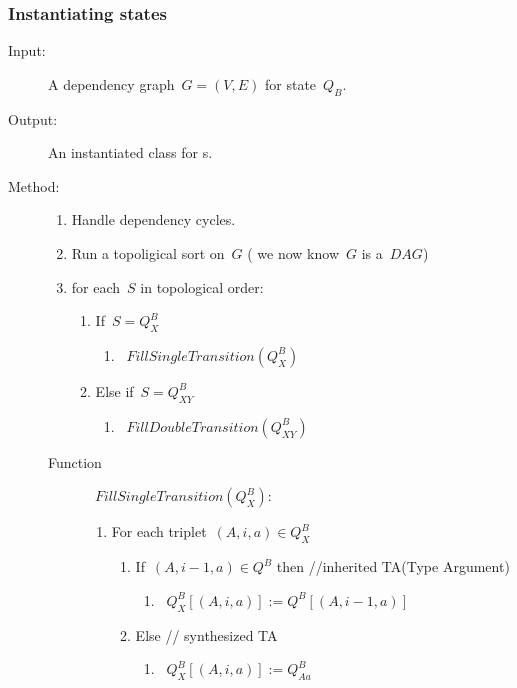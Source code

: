 \subsubsection*{Instantiating states}
\begin{description}
  \item [Input:] A dependency graph~$G=(V,E)$ for state~$Q_B$.
  \item [Output:] An instantiated class for s.
  \item [Method:]
  \begin{enumerate}
    \item Handle dependency cycles.
    \item Run a topoligical sort on~$G$ ( we now know~$G$ is a~$DAG$)
    \item for each~$S$ in topological order:
          \begin{enumerate}
            \item If~$S=Q_{X}^B$
                  \begin{enumerate}
                    \item~$FillSingleTransition(Q_{X}^B)$
                  \end{enumerate}
            \item Else if~$S=Q_{XY}^B$
                  \begin{enumerate}
                    \item~$FillDoubleTransition(Q_{XY}^B)$
                  \end{enumerate}
          \end{enumerate}
  \end{enumerate}
  \begin{description}
    \item [Function]~$FillSingleTransition(Q_{X}^B):$
    \begin{enumerate}
      \item For each triplet~$(A,i,a)∈Q_{X}^B$
            \begin{enumerate}
              \item If~$(A,i-1,a)∈Q^B$ then //inherited TA(Type Argument)
                    \begin{enumerate}
                      \item~$Q_{X}^B[(A,i,a)]:=Q^B[(A,i-1,a)]$
                    \end{enumerate}
              \item Else // synthesized TA
                    \begin{enumerate}
                      \item~$Q_{X}^B[(A,i,a)]:=Q_{Aa}^B$

\end{enumerate}
\end{enumerate}
\end{enumerate}
\end{description}
\end{description}
